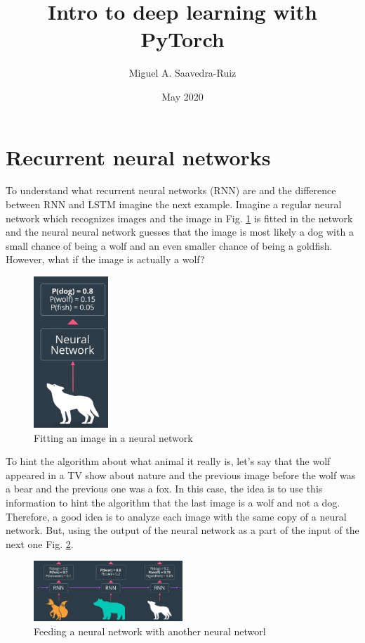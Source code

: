 \documentclass{article}
\title{Intro to deep learning with PyTorch}
\author{Miguel A. Saavedra-Ruiz}
\date{May 2020}
\begin{document}
\maketitle

\section*{Recurrent neural networks}

To understand what recurrent neural networks (RNN) are and the difference between RNN and LSTM imagine the next example. Imagine a regular neural network which recognizes images and the image in Fig. \ref{fig:f1} is fitted in the network and the neural neural network guesses that the image is most likely a dog with a small chance of being a wolf and an even smaller chance of being a goldfish. However, what if the image is actually a wolf?


\begin{figure}[ht]
    \centering
    \includegraphics[width=0.25\textwidth,height=0.25\textheight,keepaspectratio]{images/fitting.png}
    \captionsetup{justification=centering}
    \caption{Fitting an image in a neural network}
    \label{fig:f1}
\end{figure}

To hint the algorithm about what animal it really is, let's say that the wolf appeared in a TV show about nature and the previous image before the wolf was a bear and the previous one was a fox. In this case, the idea is to use this information to hint the algorithm that the last image is a wolf and not a dog. Therefore, a good idea is to analyze each image with the same copy of a neural network. But, using the output of the neural network as a part of the input of the next one Fig. \ref{fig:f2}. 

\begin{figure}[ht]
    \centering
    \includegraphics[width=0.5\textwidth,height=0.5\textheight,keepaspectratio]{images/recurrent.png}
    \captionsetup{justification=centering}
    \caption{Feeding a neural network with another neural networl}
    \label{fig:f2}
\end{figure}
\end{document}
